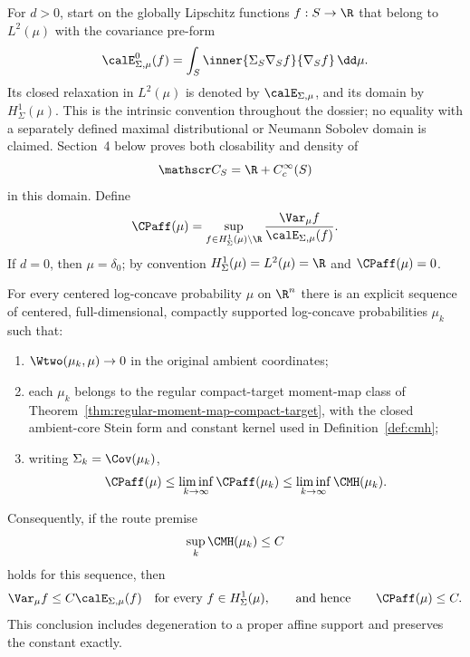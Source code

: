 \documentclass[../main.tex]{subfiles}
\begin{document}
For $d>0$, start on the globally Lipschitz functions $f:S\to\R$ that belong to $L^2(\mu)$ with
the covariance pre-form
\begin{equation}
  \calE_{\Sigma,\mu}^{0}(f)
  =\int_S\inner{\Sigma_S\nabla_S f}{\nabla_S f}\,\dd\mu.
  \label{eq:sol-cmh-approx-covariance-preform}
\end{equation}
Its closed relaxation in $L^2(\mu)$ is denoted by
$\calE_{\Sigma,\mu}$, and its domain by $H^1_\Sigma(\mu)$.  This is the intrinsic convention
throughout the dossier; no equality with a separately defined maximal distributional or
Neumann Sobolev domain is claimed.  Section~4 below proves both closability and density of
\[
  \mathscr C_S=\R+C_c^\infty(S)
  \label{eq:sol-cmh-approx-intrinsic-core}
\]
in this domain.  Define
\begin{equation}
  \CPaff(\mu)
  =\sup_{f\in H^1_\Sigma(\mu)\setminus\R}
       \frac{\Var_\mu f}{\calE_{\Sigma,\mu}(f)}.
  \label{eq:sol-cmh-approx-affine-constant}
\end{equation}
If $d=0$, then $\mu=\delta_0$; by convention
$H^1_\Sigma(\mu)=L^2(\mu)=\R$ and $\CPaff(\mu)=0$.

\begin{theorem}
\label{thm:sol-cmh-approximation}
For every centered log-concave probability $\mu$ on $\R^n$ there is an explicit sequence of
centered, full-dimensional, compactly supported log-concave probabilities $\mu_k$ such that:
\begin{enumerate}[label=(\roman*),leftmargin=2.2em]
  \item $\Wtwo(\mu_k,\mu)\to0$ in the original ambient coordinates;
  \item each $\mu_k$ belongs to the regular compact-target moment-map class of
        Theorem~\ref{thm:regular-moment-map-compact-target}, with the closed ambient-core Stein
        form and constant kernel used in Definition~\ref{def:cmh};
  \item writing $\Sigma_k=\Cov(\mu_k)$,
        \begin{equation}
          \CPaff(\mu)
          \le \liminf_{k\to\infty}\CPaff(\mu_k)
          \le \liminf_{k\to\infty}\CMH(\mu_k).
          \label{eq:sol-cmh-approx-liminf}
        \end{equation}
\end{enumerate}
Consequently, if the route premise
\begin{equation}
  \sup_k\CMH(\mu_k)\le C
  \label{eq:sol-cmh-approx-premise}
\end{equation}
holds for this sequence, then
\[
  \Var_\mu f\le C\calE_{\Sigma,\mu}(f)
  \quad\text{for every }f\in H^1_\Sigma(\mu),
  \qquad\text{and hence}\qquad
  \CPaff(\mu)\le C.
\]
This conclusion includes degeneration to a proper affine support and preserves the constant
exactly.
\end{theorem}
\end{document}

